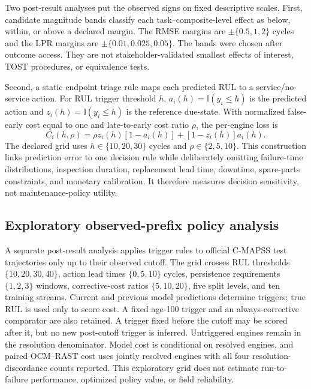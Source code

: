 \documentclass[preprint,12pt,numbers,sort&compress]{elsarticle}
\begin{document}
Two post-result analyses put the observed signs on fixed descriptive scales. First, candidate magnitude bands classify each task--composite-level effect as below, within, or above a declared margin. The RMSE margins are $\pm\{0.5,1,2\}$ cycles and the LPR margins are $\pm\{0.01,0.025,0.05\}$. The bands were chosen after outcome access. They are not stakeholder-validated smallest effects of interest, TOST procedures, or equivalence tests.

Second, a static endpoint triage rule maps each predicted RUL to a service/no-service action. For RUL trigger threshold $h$, $a_i(h)=\mathbb I(\hat y_i\leq h)$ is the predicted action and $z_i(h)=\mathbb I(y_i\leq h)$ is the reference due-state. With normalized false-early cost equal to one and late-to-early cost ratio $\rho$, the per-engine loss is
\begin{equation}
  C_i(h,\rho)=\rho z_i(h)[1-a_i(h)]+[1-z_i(h)]a_i(h).
  \label{eq:maintenance-cost}
\end{equation}
The declared grid uses $h\in\{10,20,30\}$ cycles and $\rho\in\{2,5,10\}$. This construction links prediction error to one decision rule while deliberately omitting failure-time distributions, inspection duration, replacement lead time, downtime, spare-parts constraints, and monetary calibration. It therefore measures decision sensitivity, not maintenance-policy utility.

\subsection{Exploratory observed-prefix policy analysis}

A separate post-result analysis applies trigger rules to official C-MAPSS test trajectories only up to their observed cutoff. The grid crosses RUL thresholds $\{10,20,30,40\}$, action lead times $\{0,5,10\}$ cycles, persistence requirements $\{1,2,3\}$ windows, corrective-cost ratios $\{5,10,20\}$, five split levels, and ten training streams. Current and previous model predictions determine triggers; true RUL is used only to score cost. A fixed age-100 trigger and an always-corrective comparator are also retained. A trigger fixed before the cutoff may be scored after it, but no new post-cutoff trigger is inferred. Untriggered engines remain in the resolution denominator. Model cost is conditional on resolved engines, and paired OCM--RAST cost uses jointly resolved engines with all four resolution-discordance counts reported. This exploratory grid does not estimate run-to-failure performance, optimized policy value, or field reliability.
\end{document}
